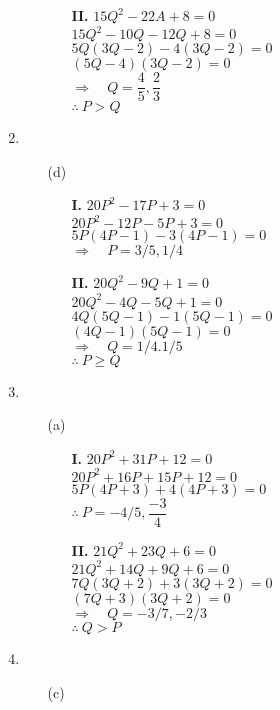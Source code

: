 \begin{multicols}{2}
\begin{enumerate}
\begin{itemize}
\begin{itemize}
    \item[{\bf II.}] $15Q^2 - 22A + 8 = 0$\\
      $15Q^2 - 10Q - 12Q + 8 = 0$\\
      $5Q(3Q - 2) -4(3Q - 2) = 0$\\
      $(5Q - 4)(3Q - 2) = 0$\\
      $\Rightarrow\quad Q = \dfrac{4}{5}, \dfrac{2}{3}$\\
      $\therefore~ P > Q$
    \end{itemize}
  \end{itemize}
\item
  \begin{itemize}
  \item[(d)]
    \begin{itemize}
    \item[{\bf I.}] $20P^2 - 17P + 3 = 0$\\
      $20P^2 - 12P - 5P + 3 = 0$\\
      $5P(4P - 1) -3(4P - 1) = 0$\\
      $\Rightarrow\quad P = 3/5, 1/4$

    \item[{\bf II.}] $20Q^2 - 9Q + 1 = 0$\\
      $20Q^2 - 4Q - 5Q + 1 = 0$\\
      $4Q(5Q - 1) -1(5Q - 1) = 0$\\
      $(4Q - 1)(5Q - 1) = 0$\\
      $\Rightarrow\quad Q = 1/4. 1/5$\\
      $\therefore~ P \geq Q$
      \end{itemize}
  \end{itemize}
\item
  \begin{itemize}
  \item[(a)]
    \begin{itemize}
    \item[{\bf I.}] $20P^2 + 31P + 12 = 0$\\
      $20P^2 + 16P + 15P + 12 = 0$\\
      $5P(4P + 3) + 4(4P + 3) = 0$\\
      $\therefore~ P = -4/5, \dfrac{-3}{4}$

    \item[{\bf II.}] $21Q^2 + 23Q + 6 = 0$\\
      $21Q^2 + 14Q + 9Q + 6 = 0$\\
      $7Q(3Q + 2) +3(3Q + 2) = 0$\\
      $(7Q + 3)(3Q + 2) = 0$\\
      $\Rightarrow\quad Q = -3/7, -2/3$\\
      $\therefore~ Q > P$
      \end{itemize}
  \end{itemize}
\item
  \begin{itemize}
  \item[(c)]


\end{itemize}
\end{enumerate}
\end{multicols}
